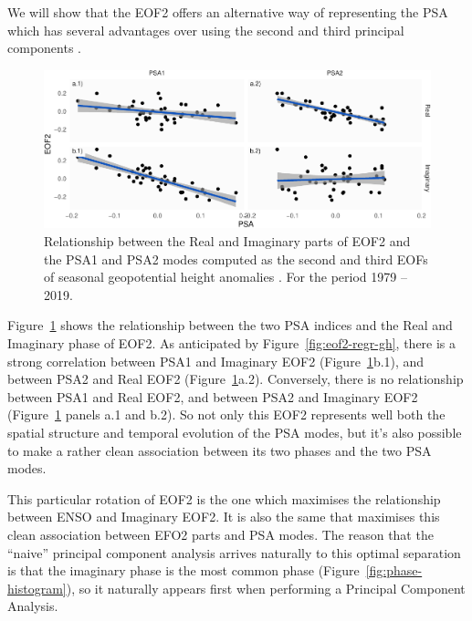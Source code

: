 \documentclass[smallextended]{svjour3}       %
\begin{document}
We will show that the EOF2 offers an alternative way of representing the PSA which has several advantages over using the second and third principal components .



\begin{figure}
\includegraphics{../figures/psa-eof2-1} \caption{Relationship between the Real and Imaginary parts of EOF2 and the PSA1 and PSA2 modes computed as the second and third EOFs of seasonal geopotential height anomalies \citep{mo2001}. For the period 1979 -- 2019.}\label{fig:psa-eof2}
\end{figure}

Figure~\ref{fig:psa-eof2} shows the relationship between the two PSA indices and the Real and Imaginary phase of EOF2. As anticipated by Figure~\ref{fig:eof2-regr-gh}, there is a strong correlation between PSA1 and Imaginary EOF2 (Figure~\ref{fig:psa-eof2}b.1), and between PSA2 and Real EOF2 (Figure~\ref{fig:psa-eof2}a.2). Conversely, there is no relationship between PSA1 and Real EOF2, and between PSA2 and Imaginary EOF2 (Figure~\ref{fig:psa-eof2} panels a.1 and b.2). So not only this EOF2 represents well both the spatial structure and temporal evolution of the PSA modes, but it's also possible to make a rather clean association between its two phases and the two PSA modes.

This particular rotation of EOF2 is the one which maximises the relationship between ENSO and Imaginary EOF2. It is also the same that maximises this clean association between EFO2 parts and PSA modes. The reason that the ``naive'' principal component analysis arrives naturally to this optimal separation is that the imaginary phase is the most common phase (Figure~\ref{fig:phase-histogram}), so it naturally appears first when performing a Principal Component Analysis.
\end{document}
